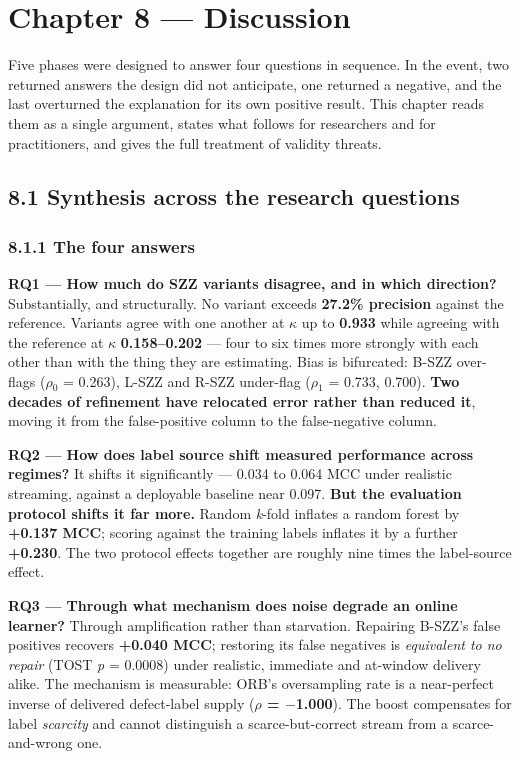 \chapter{Chapter 8 --- Discussion}\label{chapter-8-discussion}

Five phases were designed to answer four questions in sequence. In the
event, two returned answers the design did not anticipate, one returned
a negative, and the last overturned the explanation for its own positive
result. This chapter reads them as a single argument, states what
follows for researchers and for practitioners, and gives the full
treatment of validity threats.

\section{8.1 Synthesis across the research
questions}\label{synthesis-across-the-research-questions}

\subsection{8.1.1 The four answers}\label{the-four-answers}

\textbf{RQ1 --- How much do SZZ variants disagree, and in which
direction?} Substantially, and structurally. No variant exceeds
\textbf{27.2\% precision} against the reference. Variants agree with one
another at \ensuremath{\kappa} up to \textbf{0.933} while agreeing with the reference at \ensuremath{\kappa}
\textbf{0.158--0.202} --- four to six times more strongly with each
other than with the thing they are estimating. Bias is bifurcated: B-SZZ
over-flags (\ensuremath{\rho}\ensuremath{_0} = 0.263), L-SZZ and R-SZZ under-flag (\ensuremath{\rho}\ensuremath{_1} = 0.733, 0.700).
\textbf{Two decades of refinement have relocated error rather than
reduced it}, moving it from the false-positive column to the
false-negative column.

\textbf{RQ2 --- How does label source shift measured performance across
regimes?} It shifts it significantly --- 0.034 to 0.064 MCC under
realistic streaming, against a deployable baseline near 0.097.
\textbf{But the evaluation protocol shifts it far more.} Random
\emph{k}-fold inflates a random forest by \textbf{+0.137 MCC}; scoring
against the training labels inflates it by a further \textbf{+0.230}.
The two protocol effects together are roughly nine times the
label-source effect.

\textbf{RQ3 --- Through what mechanism does noise degrade an online
learner?} Through amplification rather than starvation. Repairing
B-SZZ's false positives recovers \textbf{+0.040 MCC}; restoring its
false negatives is \emph{equivalent to no repair} (TOST \emph{p} =
0.0008) under realistic, immediate and at-window delivery alike. The
mechanism is measurable: ORB's oversampling rate is a near-perfect
inverse of delivered defect-label supply (\textbf{\ensuremath{\rho} = \ensuremath{-}1.000}). The
boost compensates for label \emph{scarcity} and cannot distinguish a
scarce-but-correct stream from a scarce-and-wrong one.

